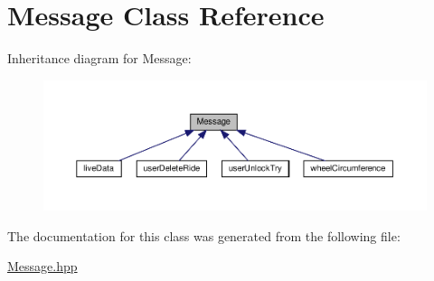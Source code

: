 \hypertarget{classMessage}{}\section{Message Class Reference}
\label{classMessage}


Inheritance diagram for Message\+:\nopagebreak
\begin{figure}[H]
\begin{center}
\leavevmode
\includegraphics[width=350pt]{classMessage__inherit__graph}
\end{center}
\end{figure}


The documentation for this class was generated from the following file\+:\begin{DoxyCompactItemize}
\item 
\hyperlink{Message_8hpp}{Message.\+hpp}\end{DoxyCompactItemize}
